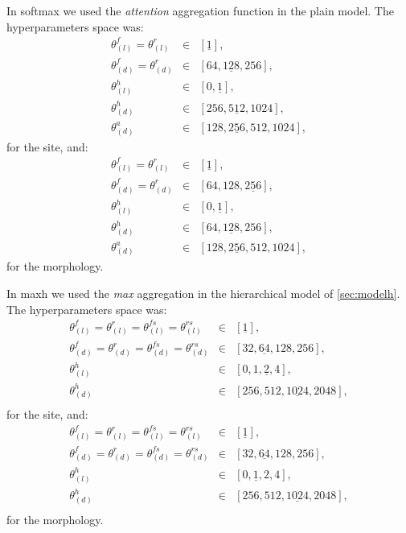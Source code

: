 In \ac{softmax} we used the \emph{attention} aggregation function in the
plain model. The hyperparameters
space was:
\begin{align*}
  \theta_{(l)}^f=\theta_{(l)}^r&\in&[\underline{1}],\\
  \theta_{(d)}^f=\theta_{(d)}^r&\in&[64,\underline{128},256],\\
  \theta_{(l)}^h&\in&[0,\underline{1}],\\
  \theta_{(d)}^h&\in&[256,\underline{512},1024],\\
  \theta_{(d)}^a&\in&[128,\underline{256},512,1024],
\end{align*}
for the site, and:
\begin{align*}
  \theta_{(l)}^f=\theta_{(l)}^r&\in&[\underline{1}],\\
  \theta_{(d)}^f=\theta_{(d)}^r&\in&[64,128,\underline{256}],\\
  \theta_{(l)}^h&\in&[0,\underline{1}],\\
  \theta_{(d)}^h&\in&[64,\underline{128},256],\\
  \theta_{(d)}^a&\in&[128,\underline{256},512,1024],
\end{align*}
for the morphology.

In \ac{maxh} we used the \emph{max} aggregation in the hierarchical
model of \cref{sec:modelh}. The hyperparameters space was:
\begin{align*}
  \theta_{(l)}^f=\theta_{(l)}^r=\theta_{(l)}^{fs}=\theta_{(l)}^{rs}&\in&[\underline{1}],\\
  \theta_{(d)}^f=\theta_{(d)}^r=\theta_{(d)}^{fs}=\theta_{(d)}^{rs}&\in&[32,\underline{64},128,256],\\
  \theta_{(l)}^h&\in&[0,1,\underline{2},4],\\
  \theta_{(d)}^h&\in&[256,512,\underline{1024},2048],\\
\end{align*}
for the site, and:
\begin{align*}
  \theta_{(l)}^f=\theta_{(l)}^r=\theta_{(l)}^{fs}=\theta_{(l)}^{rs}&\in&[\underline{1}],\\
  \theta_{(d)}^f=\theta_{(d)}^r=\theta_{(d)}^{fs}=\theta_{(d)}^{rs}&\in&[32,\underline{64},128,256],\\
  \theta_{(l)}^h&\in&[0,\underline{1},2,4],\\
  \theta_{(d)}^h&\in&[256,512,\underline{1024},2048],\\
\end{align*}
for the morphology.

